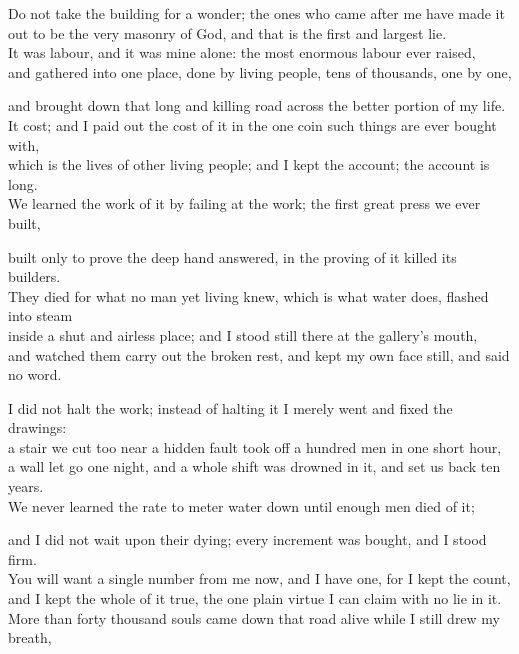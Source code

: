 \ornament

\begin{scripture}
Do not take the building for a wonder; the ones who came after me have made it \\
out to be the very masonry of God, and that is the first and largest lie. \\
It was labour, and it was mine alone: the most enormous labour ever raised, \\
and gathered into one place, done by living people, tens of thousands, one by one, \\
\medskip

and brought down that long and killing road across the better portion of my life. \\
It cost; and I paid out the cost of it in the one coin such things are ever bought with, \\
which is the lives of other living people; and I kept the account; the account is long. \\
We learned the work of it by failing at the work; the first great press we ever built, \\
\medskip

built only to prove the deep hand answered, in the proving of it killed its builders. \\
They died for what no man yet living knew, which is what water does, flashed into steam \\
inside a shut and airless place; and I stood still there at the gallery's mouth, \\
and watched them carry out the broken rest, and kept my own face still, and said no word. \\
\medskip

I did not halt the work; instead of halting it I merely went and fixed the drawings: \\
a stair we cut too near a hidden fault took off a hundred men in one short hour, \\
a wall let go one night, and a whole shift was drowned in it, and set us back ten years. \\
We never learned the rate to meter water down until enough men died of it; \\
\medskip

and I did not wait upon their dying; every increment was bought, and I stood firm. \\
You will want a single number from me now, and I have one, for I kept the count, \\
and I kept the whole of it true, the one plain virtue I can claim with no lie in it. \\
More than forty thousand souls came down that road alive while I still drew my breath, \\
\medskip


\end{scripture}
